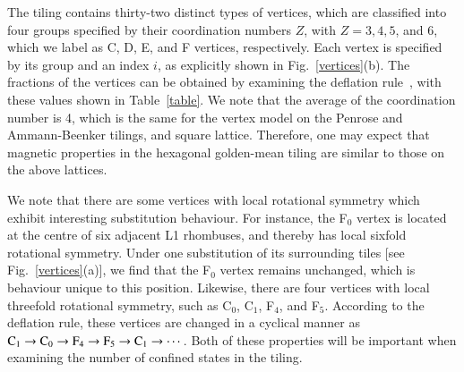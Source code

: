 \documentclass[aps,twocolumn,pra,superscriptaddress,amsmath,amssymb]{revtex4-1}
\begin{document}
The tiling contains thirty-two distinct types of vertices, which are classified into four groups specified by their coordination numbers $Z$, with $Z=3, 4, 5$, and $6$, which we label as C, D, E, and F vertices, respectively.
Each vertex is specified by its group and an index $i$,
as explicitly shown in Fig.~\ref{vertices}(b). The fractions of the vertices can be obtained by examining the deflation rule~\cite{Sam}, with these values shown in Table~\ref{table}.
We note that the average of the coordination number is 4,
which is the same for the vertex model
on the Penrose and Ammann-Beenker tilings, and square lattice.
Therefore, one may expect that magnetic properties in the hexagonal golden-mean tiling
are similar to those on the above lattices.

We note that there are some vertices with local rotational symmetry which exhibit interesting substitution behaviour. For instance, the F$_0$ vertex is located at the centre of six adjacent L1 rhombuses, and thereby
has local sixfold rotational symmetry. Under one substitution of its surrounding tiles [see Fig.~\ref{vertices}(a)],
we find that the F$_0$ vertex remains unchanged, which is behaviour unique to this position. Likewise, there are four vertices with
local threefold rotational symmetry, such as
C$_0$, C$_1$, F$_4$, and F$_5$.
According to the deflation rule, these vertices are changed in a cyclical manner as
${\rm C}_1 \rightarrow {\rm C}_0 \rightarrow {\rm F}_4 \rightarrow {\rm F}_5 \rightarrow {\rm C}_1 \rightarrow\cdots$.  Both of these properties will be important when examining the number of confined states in the tiling.
\end{document}

